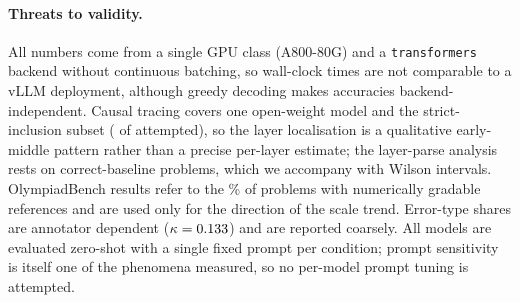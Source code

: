 \paragraph{Threats to validity.}
All numbers come from a single GPU class (A800-80G) and a \texttt{transformers}
backend without continuous batching, so wall-clock times are not comparable to a
vLLM deployment, although greedy decoding makes accuracies backend-independent.
Causal tracing covers one open-weight model and the strict-inclusion subset
(\nbCausalValid{} of \nbCausalAttempts{} attempted), so the layer localisation is a
qualitative early-middle pattern rather than a precise per-layer estimate; the
layer-parse analysis rests on \nbCleanCorrect{} correct-baseline problems, which we
accompany with Wilson intervals. OlympiadBench results refer to the
\pctOlympiadScorable\% of problems with numerically gradable references and are used
only for the direction of the scale trend. Error-type shares are annotator
dependent ($\kappa=0.133$) and are reported coarsely. All models are
evaluated zero-shot with a single fixed prompt per condition; prompt sensitivity is
itself one of the phenomena measured, so no per-model prompt tuning is attempted.

